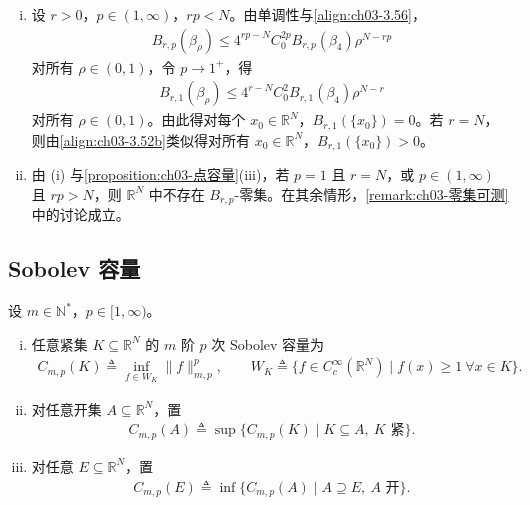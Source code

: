 \documentclass[../../main.tex]{subfiles}%
\begin{document}
\begin{remark}\label{remark:ch03-无零容量集}
\begin{enumerate}[(i)]
\item 设 $r>0$，$p\in(1,\infty)$，$rp<N$。由单调性与\eqref{align:ch03-3.56}，
\begin{align}
B_{r,p}(\beta_\rho)\leqslant 4^{rp-N}C_0^{2p}B_{r,p}(\beta_4)\rho^{N-rp}\label{align:ch03-3.57}
\end{align}
对所有 $\rho\in(0,1)$，令 $p\to1^+$，得
\begin{align*}
B_{r,1}(\beta_\rho)\leqslant 4^{r-N}C_0^2B_{r,1}(\beta_4)\rho^{N-r}
\end{align*}
对所有 $\rho\in(0,1)$。由此得对每个 $x_0\in\mathbb{R}^N$，$B_{r,1}(\{x_0\})=0$。若 $r=N$，则由\eqref{align:ch03-3.52b}类似得对所有 $x_0\in\mathbb{R}^N$，$B_{r,1}(\{x_0\})>0$。
\item 由 (i) 与\cref{proposition:ch03-点容量}(iii)，若 $p=1$ 且 $r=N$，或 $p\in(1,\infty)$ 且 $rp>N$，则 $\mathbb{R}^N$ 中不存在 $B_{r,p}$-零集。在其余情形，\cref{remark:ch03-零集可测}中的讨论成立。
\end{enumerate}
\end{remark}

\subsection{Sobolev 容量}\label{subsection:ch03-Sobolev容量}

\begin{definition}\label{definition:ch03-Sobolev容量}
设 $m\in\mathbb{N}^*$，$p\in[1,\infty)$。
\begin{enumerate}[(i)]
\item 任意紧集 $K\subseteq\mathbb{R}^N$ 的 $m$ 阶 $p$ 次 Sobolev 容量为
\begin{align}
C_{m,p}(K)\triangleq \inf_{f\in W_K}\|f\|_{m,p}^p,\qquad
W_K\triangleq \{f\in C^\infty_c(\mathbb{R}^N)\mid f(x)\geqslant1\ \forall x\in K\}.\label{align:ch03-3.58a}
\end{align}
\item 对任意开集 $A\subseteq\mathbb{R}^N$，置
\begin{align}
C_{m,p}(A)\triangleq \sup\{C_{m,p}(K)\mid K\subseteq A,\ K\text{ 紧}\}.\label{align:ch03-3.58b}
\end{align}
\item 对任意 $E\subseteq\mathbb{R}^N$，置
\begin{align}
C_{m,p}(E)\triangleq \inf\{C_{m,p}(A)\mid A\supseteq E,\ A\text{ 开}\}.\label{align:ch03-3.58c}
\end{align}
\end{enumerate}
\end{definition}
\end{document}
